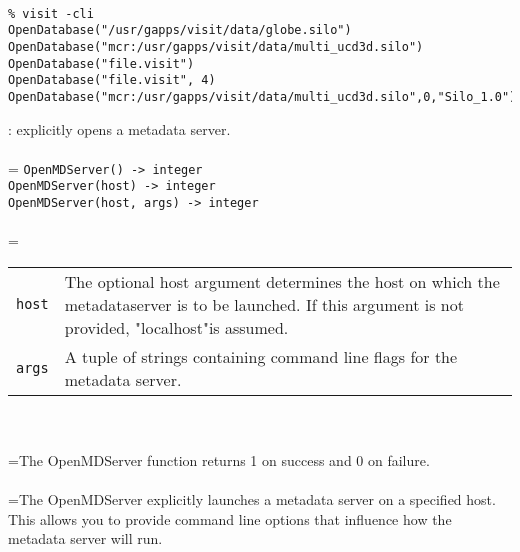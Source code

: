 \documentclass[10pt,a4paper]{report}
\begin{document}
\\[-6mm]
\begin{verbatim}% visit -cli
OpenDatabase("/usr/gapps/visit/data/globe.silo")
OpenDatabase("mcr:/usr/gapps/visit/data/multi_ucd3d.silo")
OpenDatabase("file.visit")
OpenDatabase("file.visit", 4)
OpenDatabase("mcr:/usr/gapps/visit/data/multi_ucd3d.silo",0,"Silo_1.0")
\end{verbatim}
\newpage


{}
: explicitly opens a metadata server.\\[-3mm]

 \\ 
\hangindent=\parindent 
\verb!OpenMDServer() -> integer!\\ 
\verb!OpenMDServer(host) -> integer!\\ 
\verb!OpenMDServer(host, args) -> integer!\\ [-3mm]

 \\ 
\hangindent=\parindent 
\begin{tabular}{lp{9cm}}
\verb!host! & The optional host argument determines the host on which the metadataserver is to be launched. If this argument is not provided, "localhost"is assumed. \\
\verb!args! & A tuple of strings containing command line flags for the metadata server. \\
\end{tabular} \\[-2mm]


 \\ 
\hangindent=\parindent The OpenMDServer function returns 1 on success and 0 on failure. \\[-3mm] 

 \\ 
\hangindent=\parindent The OpenMDServer explicitly launches a metadata server on a specified host. This allows you to provide command line options that influence how the metadata server will run. \\
\end{document}
